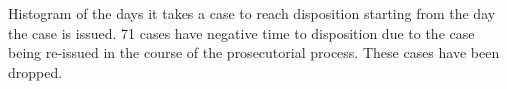 Histogram of the days it takes a case to reach disposition starting from the day the case is issued. 71 cases have negative time to disposition due to the case being re-issued in the course of the prosecutorial process. These cases have been dropped.
\label{fig:daysToDispo}